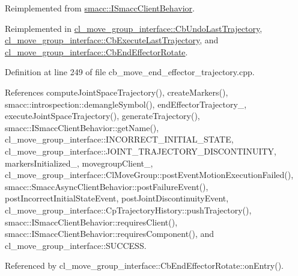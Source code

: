 Reimplemented from \hyperlink{classsmacc_1_1ISmaccClientBehavior_a3ec24a839087c550e1d62a81e48cf530}{smacc\+::\+I\+Smacc\+Client\+Behavior}.



Reimplemented in \hyperlink{classcl__move__group__interface_1_1CbUndoLastTrajectory_a3c55fa93ff65d8eccb8cc14a420cb7b2}{cl\+\_\+move\+\_\+group\+\_\+interface\+::\+Cb\+Undo\+Last\+Trajectory}, \hyperlink{classcl__move__group__interface_1_1CbExecuteLastTrajectory_ac78713663c39635ca5ac9a749503e800}{cl\+\_\+move\+\_\+group\+\_\+interface\+::\+Cb\+Execute\+Last\+Trajectory}, and \hyperlink{classcl__move__group__interface_1_1CbEndEffectorRotate_a3e60bfba48906696587d66af89f7ee2b}{cl\+\_\+move\+\_\+group\+\_\+interface\+::\+Cb\+End\+Effector\+Rotate}.



Definition at line 249 of file cb\+\_\+move\+\_\+end\+\_\+effector\+\_\+trajectory.\+cpp.



References compute\+Joint\+Space\+Trajectory(), create\+Markers(), smacc\+::introspection\+::demangle\+Symbol(), end\+Effector\+Trajectory\+\_\+, execute\+Joint\+Space\+Trajectory(), generate\+Trajectory(), smacc\+::\+I\+Smacc\+Client\+Behavior\+::get\+Name(), cl\+\_\+move\+\_\+group\+\_\+interface\+::\+I\+N\+C\+O\+R\+R\+E\+C\+T\+\_\+\+I\+N\+I\+T\+I\+A\+L\+\_\+\+S\+T\+A\+TE, cl\+\_\+move\+\_\+group\+\_\+interface\+::\+J\+O\+I\+N\+T\+\_\+\+T\+R\+A\+J\+E\+C\+T\+O\+R\+Y\+\_\+\+D\+I\+S\+C\+O\+N\+T\+I\+N\+U\+I\+TY, markers\+Initialized\+\_\+, movegroup\+Client\+\_\+, cl\+\_\+move\+\_\+group\+\_\+interface\+::\+Cl\+Move\+Group\+::post\+Event\+Motion\+Execution\+Failed(), smacc\+::\+Smacc\+Async\+Client\+Behavior\+::post\+Failure\+Event(), post\+Incorrect\+Initial\+State\+Event, post\+Joint\+Discontinuity\+Event, cl\+\_\+move\+\_\+group\+\_\+interface\+::\+Cp\+Trajectory\+History\+::push\+Trajectory(), smacc\+::\+I\+Smacc\+Client\+Behavior\+::requires\+Client(), smacc\+::\+I\+Smacc\+Client\+Behavior\+::requires\+Component(), and cl\+\_\+move\+\_\+group\+\_\+interface\+::\+S\+U\+C\+C\+E\+SS.



Referenced by cl\+\_\+move\+\_\+group\+\_\+interface\+::\+Cb\+End\+Effector\+Rotate\+::on\+Entry().


